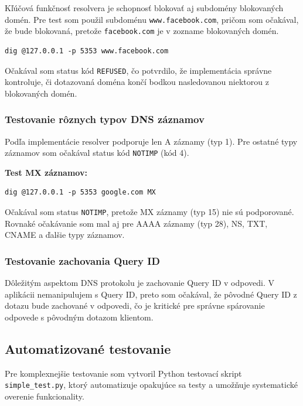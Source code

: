 \documentclass[12pt,a4paper]{article}
\begin{document}
Kľúčová funkčnosť resolvera je schopnosť blokovať aj subdomény blokovaných domén. Pre test som použil subdoménu \texttt{www.facebook.com}, pričom som očakával, že bude blokovaná, pretože \texttt{facebook.com} je v zozname blokovaných domén.

\begin{verbatim}
dig @127.0.0.1 -p 5353 www.facebook.com
\end{verbatim}

Očakával som status kód \texttt{REFUSED}, čo potvrdilo, že implementácia správne kontroluje, či dotazovaná doména končí bodkou nasledovanou niektorou z blokovaných domén.

\subsubsection{Testovanie rôznych typov DNS záznamov}

Podľa implementácie resolver podporuje len A záznamy (typ 1). Pre ostatné typy záznamov som očakával status kód \texttt{NOTIMP} (kód 4).

\textbf{Test MX záznamov:}

\begin{verbatim}
dig @127.0.0.1 -p 5353 google.com MX
\end{verbatim}

Očakával som status \texttt{NOTIMP}, pretože MX záznamy (typ 15) nie sú podporované. Rovnaké očakávanie som mal aj pre AAAA záznamy (typ 28), NS, TXT, CNAME a ďalšie typy záznamov.

\subsubsection{Testovanie zachovania Query ID}

Dôležitým aspektom DNS protokolu je zachovanie Query ID v odpovedi. V aplikácii nemanipulujem s Query ID, preto som očakával, že pôvodné Query ID z dotazu bude zachované v odpovedi, čo je kritické pre správne spárovanie odpovede s pôvodným dotazom klientom.

\subsection{Automatizované testovanie}

Pre komplexnejšie testovanie som vytvoril Python testovací skript \texttt{simple\_test.py}, ktorý automatizuje opakujúce sa testy a umožňuje systematické overenie funkcionality.
\end{document}
